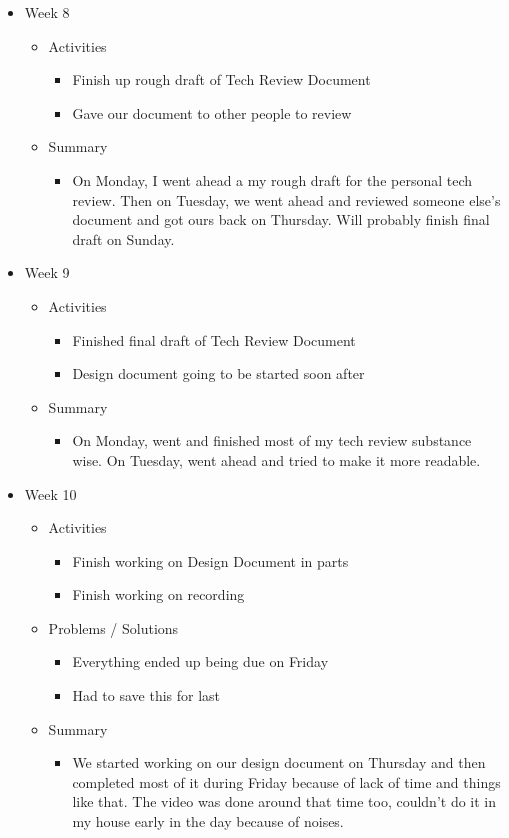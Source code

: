 \begin{itemize}
\begin{itemize}
\end{itemize}
\item Week 8
\begin{itemize}
\item Activities
\begin{itemize}
\item Finish up rough draft of Tech Review Document
\item Gave our document to other people to review
\end{itemize}
\item Summary
\begin{itemize}
\item On Monday, I went ahead a my rough draft for the personal tech review. Then on Tuesday, we went ahead and reviewed someone else's document and got ours back on Thursday. Will probably finish final draft on Sunday.
\end{itemize}
\end{itemize}
\item Week 9
\begin{itemize}
\item Activities
\begin{itemize}
\item Finished final draft of Tech Review Document
\item Design document going to be started soon after
\end{itemize}
\item Summary
\begin{itemize}
\item On Monday, went and finished most of my tech review substance wise. On Tuesday, went ahead and tried to make it more readable.
\end{itemize}
\end{itemize}
\item Week 10
\begin{itemize}
\item Activities
\begin{itemize}
\item Finish working on Design Document in parts
\item Finish working on recording
\end{itemize}
\item Problems / Solutions
\begin{itemize}
\item Everything ended up being due on Friday
\item Had to save this for last
\end{itemize}
\item Summary
\begin{itemize}
\item We started working on our design document on Thursday and then completed most of it during Friday because of lack of time and things like that. The video was done around that time too, couldn't do it in my house early in the day because of noises.
\end{itemize}
\end{itemize}
\end{itemize}
